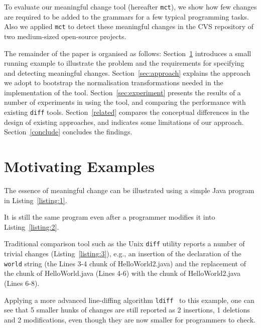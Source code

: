 \documentclass[10pt, conference, compsocconf]{IEEEtran}
\begin{document}
To evaluate our meaningful change tool  (hereafter {\tt mct}), we show how few changes are required to be added to the grammars for a few typical programming tasks. Also we applied {\tt mct} to detect these meaningful changes in the CVS repository of two medium-sized open-source projects.  
   
The remainder of the paper is organised as follows: Section~\ref{sec:background} introduces a small running example to illustrate the problem and the requirements for specifying and detecting meaningful changes. Section~\ref{sec:approach} explains the approach we adopt to bootstrap the normalisation transformations needed in the implementation of the tool. 
Section~\ref{sec:experiment} presents the results of a number of experiments in using the tool, and comparing the performance with existing {\tt diff} tools. Section~\ref{related} compares the conceptual differences in the design of existing approaches, and indicates some limitations of our approach. Section~\ref{conclude} concludes the findings.

\section{Motivating Examples}\label{sec:background}
The essence of meaningful change can be illustrated using a simple Java program in Listing~\ref{listing:1}.


It is still the same program even after a programmer modifies it into Listing~\ref{listing:2}.

Traditional comparison tool such as the Unix {\tt diff} utility reports a number of trivial changes (Listing~\ref{listing:3}), e.g.,
an insertion of the declaration of the {\tt world} string (the Lines 3-4 chunk of HelloWorld2.java) and the replacement of the chunk of HelloWorld.java (Lines 4-6) with the chunk of HelloWorld2.java (Lines 6-8).
%

Applying a more advanced line-diffing algorithm {\tt ldiff}~\cite{canfora09software} to this example, one can see that 5 smaller hunks of changes are still reported as 2 insertions, 1 deletions and 2 modifications, even though they are now smaller for programmers to check.

\end{document}
